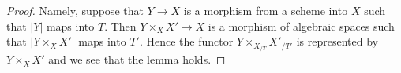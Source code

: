 \documentclass{stacks-project}
\theoremstyle{plain}
\theoremstyle{definition}
\theoremstyle{remark}
\numberwithin{equation}{subsection}
\begin{document}
\begin{proof}
Namely, suppose that $Y \to X$ is a morphism from a scheme into $X$ such
that $|Y|$ maps into $T$. Then $Y \times_X X' \to X$ is a morphism of
algebraic spaces such that $|Y \times_X X'|$ maps into $T'$. Hence the
functor $Y \times_{X_{/T}} X'_{/T'}$ is represented by $Y \times_X X'$
and we see that the lemma holds.
\end{proof}
\end{document}
